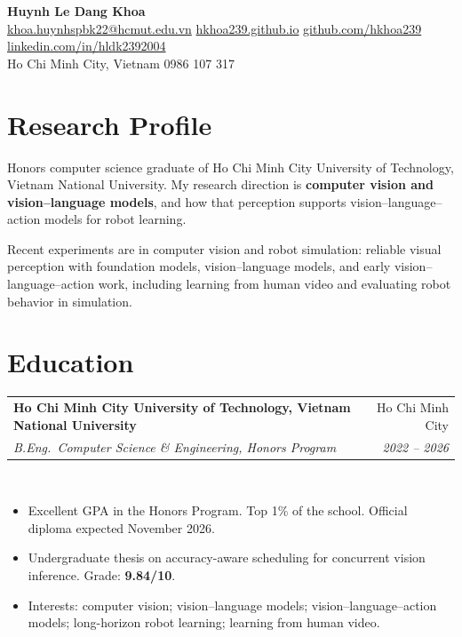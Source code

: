 \documentclass[letterpaper,11pt]{article}
\makeatletter
\newcommand{\contactsep}{\hspace{0.55em}{\color{muted}$\cdot$}\hspace{0.55em}}
\newcommand{\role}[4]{%
  \Needspace{4\baselineskip}
  \vspace{4pt}
  \begin{tabular*}{\linewidth}{@{}l@{\extracolsep{\fill}}r@{}}
    \textbf{#1} & \textcolor{muted}{#2} \\[1pt]
    \textit{#3} & \textcolor{muted}{\textit{#4}} \\
  \end{tabular*}\\[1pt]
}
\makeatother
\begin{document}
\begin{center}
  {\LARGE\bfseries Huynh Le Dang Khoa}\\[5pt]
  {\small
    \href{mailto:khoa.huynhspbk22@hcmut.edu.vn}{khoa.huynhspbk22@hcmut.edu.vn}
    \contactsep
    \href{https://hkhoa239.github.io/}{hkhoa239.github.io}
    \contactsep
    \href{https://github.com/hkhoa239}{github.com/hkhoa239}
    \contactsep
    \href{https://www.linkedin.com/in/hldk2392004}{linkedin.com/in/hldk2392004}
    \\[2pt]
    Ho Chi Minh City, Vietnam
    \contactsep
    0986 107 317
  }
\end{center}

\section*{Research Profile}

Honors computer science graduate of Ho Chi Minh City University of Technology,
Vietnam National University. My research direction is \textbf{computer vision and
vision--language models}, and how that perception supports vision--language--action
models for robot learning.

Recent experiments are in computer vision and robot simulation: reliable visual
perception with foundation models, vision--language models, and early
vision--language--action work, including learning from human video and evaluating
robot behavior in simulation.

\section*{Education}

\role
  {Ho Chi Minh City University of Technology, Vietnam National University}
  {Ho Chi Minh City}
  {B.Eng.\ Computer Science \& Engineering, Honors Program}
  {2022 -- 2026}

\begin{itemize}
  \item Excellent GPA in the Honors Program. Top 1\% of the school. Official diploma expected November 2026.
  \item Undergraduate thesis on accuracy-aware scheduling for concurrent vision inference. Grade: \textbf{9.84/10}.
  \item Interests: computer vision; vision--language models; vision--language--action models; long-horizon robot learning; learning from human video.
\end{itemize}
\end{document}
